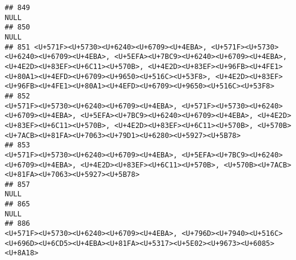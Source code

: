 \documentclass[
]{article}
\begin{document}
\begin{verbatim}
## 849                                                                                                                                                                                                                                                                                                                               NULL
## 850                                                                                                                                                                                                                                                                                                                               NULL
## 851 <U+571F><U+5730><U+6240><U+6709><U+4EBA>, <U+571F><U+5730><U+6240><U+6709><U+4EBA>, <U+5EFA><U+7BC9><U+6240><U+6709><U+4EBA>, <U+4E2D><U+83EF><U+6C11><U+570B>, <U+4E2D><U+83EF><U+96FB><U+4FE1><U+80A1><U+4EFD><U+6709><U+9650><U+516C><U+53F8>, <U+4E2D><U+83EF><U+96FB><U+4FE1><U+80A1><U+4EFD><U+6709><U+9650><U+516C><U+53F8>
## 852                                                                 <U+571F><U+5730><U+6240><U+6709><U+4EBA>, <U+571F><U+5730><U+6240><U+6709><U+4EBA>, <U+5EFA><U+7BC9><U+6240><U+6709><U+4EBA>, <U+4E2D><U+83EF><U+6C11><U+570B>, <U+4E2D><U+83EF><U+6C11><U+570B>, <U+570B><U+7ACB><U+81FA><U+7063><U+79D1><U+6280><U+5927><U+5B78>
## 853                                                                                                                                                             <U+571F><U+5730><U+6240><U+6709><U+4EBA>, <U+5EFA><U+7BC9><U+6240><U+6709><U+4EBA>, <U+4E2D><U+83EF><U+6C11><U+570B>, <U+570B><U+7ACB><U+81FA><U+7063><U+5927><U+5B78>
## 857                                                                                                                                                                                                                                                                                                                               NULL
## 865                                                                                                                                                                                                                                                                                                                               NULL
## 886                                                                                                                                                                                         <U+571F><U+5730><U+6240><U+6709><U+4EBA>, <U+796D><U+7940><U+516C><U+696D><U+6CD5><U+4EBA><U+81FA><U+5317><U+5E02><U+9673><U+6085><U+8A18>

\end{verbatim}
\end{document}
